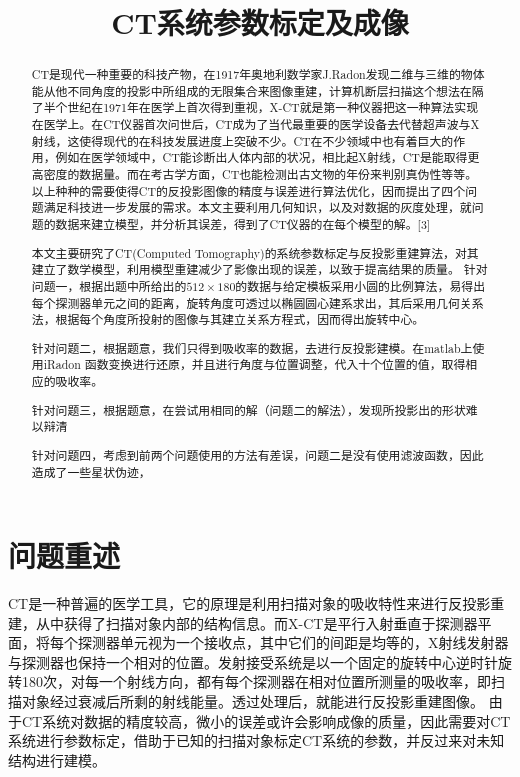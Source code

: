 \documentclass[withoutpreface,bwprint]{cumcmthesis} %
\title{CT系统参数标定及成像}
\begin{document}
 \maketitle
 \begin{abstract}
CT是现代一种重要的科技产物，在1917年奥地利数学家J.Radon发现二维与三维的物体能从他不同角度的投影中所组成的无限集合来图像重建，计算机断层扫描这个想法在隔了半个世纪在1971年在医学上首次得到重视，X-CT就是第一种仪器把这一种算法实现在医学上。在CT仪器首次问世后，CT成为了当代最重要的医学设备去代替超声波与X射线，这使得现代的在科技发展进度上突破不少。CT在不少领域中也有着巨大的作用，例如在医学领域中，CT能诊断出人体内部的状况，相比起X射线，CT是能取得更高密度的数据量。而在考古学方面，CT也能检测出古文物的年份来判别真伪性等等。以上种种的需要使得CT的反投影图像的精度与误差进行算法优化，因而提出了四个问题满足科技进一步发展的需求。本文主要利用几何知识，以及对数据的灰度处理，就问题的数据来建立模型，并分析其误差，得到了CT仪器的在每个模型的解。[3]

本文主要研究了CT(Computed Tomography)的系统参数标定与反投影重建算法，对其建立了数学模型，利用模型重建减少了影像出现的误差，以致于提高结果的质量。
针对问题一，根据出题中所给出的$512 \times 180$的数据与给定模板采用小圆的比例算法，易得出每个探测器单元之间的距离，旋转角度可透过以椭圆圆心建系求出，其后采用几何关系法，根据每个角度所投射的图像与其建立关系方程式，因而得出旋转中心。

针对问题二，根据题意，我们只得到吸收率的数据，去进行反投影建模。在matlab上使用iRadon 函数变换进行还原，并且进行角度与位置调整，代入十个位置的值，取得相应的吸收率。

针对问题三，根据题意，在尝试用相同的解（问题二的解法），发现所投影出的形状难以辩清

针对问题四，考虑到前两个问题使用的方法有差误，问题二是没有使用滤波函数，因此造成了一些星状伪迹，

\end{abstract}

\section{问题重述}

CT是一种普遍的医学工具，它的原理是利用扫描对象的吸收特性来进行反投影重建，从中获得了扫描对象内部的结构信息。而X-CT是平行入射垂直于探测器平面，将每个探测器单元视为一个接收点，其中它们的间距是均等的，X射线发射器与探测器也保持一个相对的位置。发射接受系统是以一个固定的旋转中心逆时针旋转180次，对每一个射线方向，都有每个探测器在相对位置所测量的吸收率，即扫描对象经过衰减后所剩的射线能量。透过处理后，就能进行反投影重建图像。
由于CT系统对数据的精度较高，微小的误差或许会影响成像的质量，因此需要对CT系统进行参数标定，借助于已知的扫描对象标定CT系统的参数，并反过来对未知结构进行建模。
\end{document}
